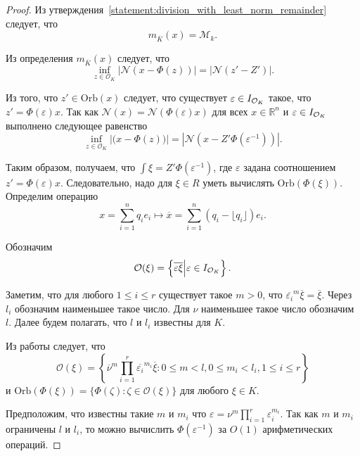 \documentclass[_00_dissertation.tex]{subfiles}
\begin{document}
\begin{proof}
    Из утверждения~\ref{statement:division_with_least_norm_remainder} следует, что
    \begin{equation*}
        m_{\overline{K}}(x) = \mathcal{M}_k.
    \end{equation*}
    
    Из определения $m_{\overline{K}}(x)$ следует, что
    \begin{equation*}
        \inf\limits_{z \in \mathcal{O}_K} |\mathcal{N}(x - \Phi(z))| = |\mathcal{N}(z' - Z')|.
    \end{equation*}

    Из того, что $z' \in \textrm{Orb}(x)$ следует, что существует $\varepsilon \in I_{\mathcal{O}_K}$ такое, что $z' = \Phi(\varepsilon)x$.
    Так как $\mathcal{N}(x) = \mathcal{N}(\Phi(\varepsilon)x)$ для всех $x \in \mathbb{R}^n$ и $\varepsilon \in I_{\mathcal{O}_K}$ выполнено следующее равенство
    \begin{equation*}
        \inf\limits_{z \in \mathcal{O}_K} |\mathcal(x - \Phi(z))| = |\mathcal{N}(x - Z'\Phi(\varepsilon^{-1}))|.
    \end{equation*}

    Таким образом, получаем, что $\int{\xi} = Z'\Phi(\varepsilon^{-1})$, где $\varepsilon$ задана соотношением $z' = \Phi(\varepsilon)x$.
    Следовательно, надо для $\xi \in R$ уметь вычислять $\textrm{Orb}(\Phi(\xi))$.
    Определим операцию
    \begin{equation*}
        x = \sum\limits_{i=1}^n q_i e_i \longmapsto \overline{x} = \sum\limits_{i=1}^n (q_i - \lfloor q_i \rfloor)e_i.
    \end{equation*}
    
    Обозначим
    \begin{equation*}
        \mathcal{O}(\xi) = \left\{
            \overline{\varepsilon\xi} \Big| \varepsilon \in I_{\mathcal{O}_K}
    	\right\}.
    \end{equation*}
    
    Заметим, что для любого $1 \le i \le r$ существует такое $m > 0$, что $\overline{\varepsilon_i}^m\overline{\xi} = \overline{\xi}$.
    Через $l_i$ обозначим наименьшее такое число.
    Для $\nu$ наименьшее такое число обозначим $l$.
    Далее будем полагать, что $l$ и $l_i$ известны для $K$.
    
    Из работы \cite[с.~1413]{source:Lezowski} следует, что
    \begin{equation*}
        \mathcal{O}(\xi) = \left\{
            \overline{\nu}^m \prod\limits_{i=1}^r \overline{\varepsilon_i}^{m_i} \overline{\xi}:
                0 \le m < l, 0 \le m_i < l_i, 1 \le i \le r
        \right\}
    \end{equation*}
    и $\textrm{Orb}(\Phi(\xi)) = \{\Phi(\zeta):\zeta \in \mathcal{O}(\xi)\}$ для любого $\xi\in K$.

    Предположим, что известны такие $m$ и $m_i$ что $\varepsilon = \nu^m\prod_{i=1}^r \varepsilon_i^{m_i}$.
    Так как $m$ и $m_i$ ограничены $l$ и $l_i$, то можно вычислить $\Phi(\varepsilon^{-1})$ за $O(1)$ арифметических операций.
\end{proof}
\end{document}
